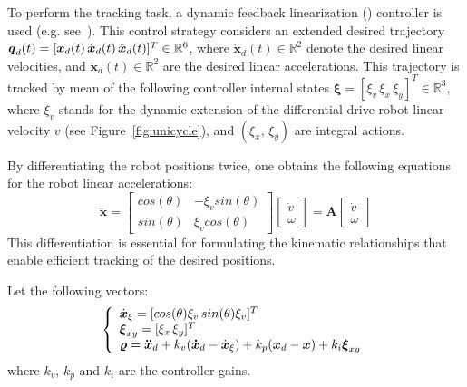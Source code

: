To perform the tracking task, a dynamic feedback linearization () controller is used (e.g. see~\cite{cDFL}).
This control strategy considers an extended desired trajectory $\boldsymbol{q}_d(t) = [\boldsymbol{x}_d(t) \, \dot{\boldsymbol{x}}_d(t) \, \ddot{\boldsymbol{x}}_d(t)]^T \in \mathbb{R}^6$, where $\Dot{\boldsymbol{x}}_d(t) \in \mathbb{R}^2$ denote the desired linear velocities, and $\ddot{\boldsymbol{x}}_d(t) \in \mathbb{R}^2$ are the desired linear accelerations.
This trajectory is tracked by mean of the following controller internal states $\boldsymbol{\xi} = [\xi_v \, \xi_x \, \xi_y]^T \in \mathbb{R}^3$, where $\xi_v$ stands for the dynamic extension of the differential drive robot linear velocity $v$ (see Figure~\ref{fig:unicycle}), and $(\xi_x, \, \xi_y)$ are integral actions. 

By differentiating the robot positions twice, one obtains the following equations for the robot linear accelerations:
\begin{equation*}
  \ddot{\boldsymbol{x}}
  = 
  \begin{bmatrix}
    cos(\theta) & -\xi_v sin(\theta) \\
    sin(\theta) & \xi_v cos(\theta) 
  \end{bmatrix} 
  \begin{bmatrix}
    \dot{v} \\
    \omega
  \end{bmatrix}
  = \boldsymbol{A} \begin{bmatrix}
    \dot{v} \\
    \omega
  \end{bmatrix}
\end{equation*}
This differentiation is essential for formulating the kinematic relationships that enable efficient tracking of the desired positions.

Let the following vectors:
\begin{equation}\label{eq:unic_control_law}
  \left \{
  \begin{array}{l l l}
       \dot{\boldsymbol{x}}_{\xi} = [cos(\theta)\xi_v \, sin(\theta)\xi_v]^T \\
       \boldsymbol{\xi}_{xy} = [\xi_x \, \xi_y]^T \\
       \boldsymbol{\varrho} = \boldsymbol{\ddot{x}}_d + k_v(\boldsymbol{\dot{x}}_d - \dot{\boldsymbol{x}}_{\xi}) + k_p(\boldsymbol{x}_{d} - \boldsymbol{x}) + k_i\boldsymbol{\xi}_{xy}
  \end{array}
  \right .
\end{equation}
where $k_v$, $k_p$ and $k_i$ are the controller gains.

